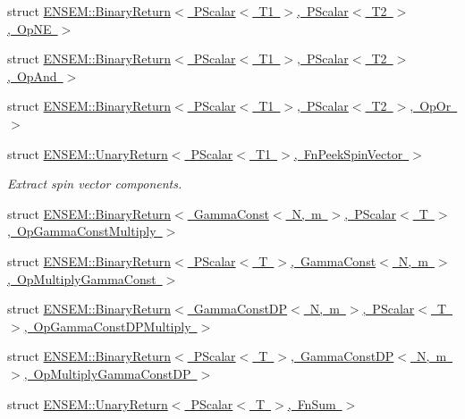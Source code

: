 \begin{DoxyCompactItemize}
\item 
struct \mbox{\hyperlink{structENSEM_1_1BinaryReturn_3_01PScalar_3_01T1_01_4_00_01PScalar_3_01T2_01_4_00_01OpNE_01_4}{E\+N\+S\+E\+M\+::\+Binary\+Return$<$ P\+Scalar$<$ T1 $>$, P\+Scalar$<$ T2 $>$, Op\+N\+E $>$}}
\item 
struct \mbox{\hyperlink{structENSEM_1_1BinaryReturn_3_01PScalar_3_01T1_01_4_00_01PScalar_3_01T2_01_4_00_01OpAnd_01_4}{E\+N\+S\+E\+M\+::\+Binary\+Return$<$ P\+Scalar$<$ T1 $>$, P\+Scalar$<$ T2 $>$, Op\+And $>$}}
\item 
struct \mbox{\hyperlink{structENSEM_1_1BinaryReturn_3_01PScalar_3_01T1_01_4_00_01PScalar_3_01T2_01_4_00_01OpOr_01_4}{E\+N\+S\+E\+M\+::\+Binary\+Return$<$ P\+Scalar$<$ T1 $>$, P\+Scalar$<$ T2 $>$, Op\+Or $>$}}
\item 
struct \mbox{\hyperlink{structENSEM_1_1UnaryReturn_3_01PScalar_3_01T1_01_4_00_01FnPeekSpinVector_01_4}{E\+N\+S\+E\+M\+::\+Unary\+Return$<$ P\+Scalar$<$ T1 $>$, Fn\+Peek\+Spin\+Vector $>$}}
\begin{DoxyCompactList}\small\item\em Extract spin vector components. \end{DoxyCompactList}\item 
struct \mbox{\hyperlink{structENSEM_1_1BinaryReturn_3_01GammaConst_3_01N_00_01m_01_4_00_01PScalar_3_01T_01_4_00_01OpGammaConstMultiply_01_4}{E\+N\+S\+E\+M\+::\+Binary\+Return$<$ Gamma\+Const$<$ N, m $>$, P\+Scalar$<$ T $>$, Op\+Gamma\+Const\+Multiply $>$}}
\item 
struct \mbox{\hyperlink{structENSEM_1_1BinaryReturn_3_01PScalar_3_01T_01_4_00_01GammaConst_3_01N_00_01m_01_4_00_01OpMultiplyGammaConst_01_4}{E\+N\+S\+E\+M\+::\+Binary\+Return$<$ P\+Scalar$<$ T $>$, Gamma\+Const$<$ N, m $>$, Op\+Multiply\+Gamma\+Const $>$}}
\item 
struct \mbox{\hyperlink{structENSEM_1_1BinaryReturn_3_01GammaConstDP_3_01N_00_01m_01_4_00_01PScalar_3_01T_01_4_00_01OpGammaConstDPMultiply_01_4}{E\+N\+S\+E\+M\+::\+Binary\+Return$<$ Gamma\+Const\+D\+P$<$ N, m $>$, P\+Scalar$<$ T $>$, Op\+Gamma\+Const\+D\+P\+Multiply $>$}}
\item 
struct \mbox{\hyperlink{structENSEM_1_1BinaryReturn_3_01PScalar_3_01T_01_4_00_01GammaConstDP_3_01N_00_01m_01_4_00_01OpMultiplyGammaConstDP_01_4}{E\+N\+S\+E\+M\+::\+Binary\+Return$<$ P\+Scalar$<$ T $>$, Gamma\+Const\+D\+P$<$ N, m $>$, Op\+Multiply\+Gamma\+Const\+D\+P $>$}}
\item 
struct \mbox{\hyperlink{structENSEM_1_1UnaryReturn_3_01PScalar_3_01T_01_4_00_01FnSum_01_4}{E\+N\+S\+E\+M\+::\+Unary\+Return$<$ P\+Scalar$<$ T $>$, Fn\+Sum $>$}}

\end{DoxyCompactItemize}
